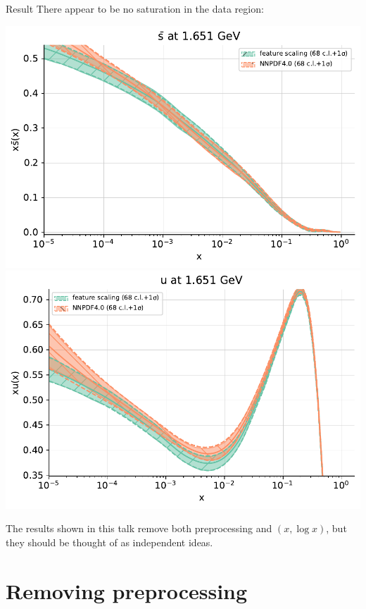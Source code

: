 \documentclass[aspectratio=169,11pt]{beamer}
\begin{document}
\begin{frame}[t]{Result}
  There appear to be no saturation in the data region:\\
  \begin{center}
    \includegraphics[height=0.5\textheight]{figures/pdf_sbar_log_feature_vs_nnpdf40.pdf}
    \includegraphics[height=0.5\textheight]{pdf_u_log_feature_vs_nnpdf40.pdf}
  \end{center}
  The results shown in this talk remove both preprocessing and $(x,\log x)$, but they should be thought of as independent ideas.
\end{frame}


\section{Removing preprocessing}
\end{document}
